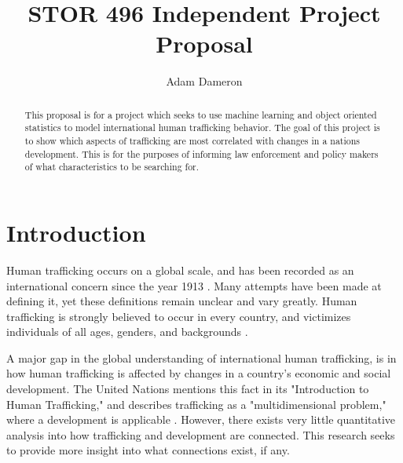 \documentclass{article} %
\title{STOR 496 Independent Project Proposal}
\author{
Adam Dameron
}
\begin{document}
\maketitle

\begin{abstract}
This proposal is for a project which seeks to use machine learning and object oriented statistics to model international human trafficking behavior. The goal of this project is to show which aspects of trafficking are most correlated with changes in a nations development. This is for the purposes of informing law enforcement and policy makers of what characteristics to be searching for.
\end{abstract}

\section{Introduction}
	Human trafficking occurs on a global scale, and has been recorded as an international concern since the year 1913 \parencite{Aromaa2007}. Many attempts have been made at defining it, yet these definitions remain unclear and vary greatly. Human trafficking is strongly believed to occur in every country, and victimizes individuals of all ages, genders, and backgrounds \parencite{JacK2012}.\medskip
	
	A major gap in the global understanding of international human trafficking, is in how human trafficking is affected by changes in a country's economic and social development. The United Nations mentions this fact in its "Introduction to Human Trafficking," and describes trafficking as a "multidimensional problem," where a development is applicable \parencite{kangaspunta_2008}. However, there exists very little quantitative analysis into how trafficking and development are connected. This research seeks to provide more insight into what connections exist, if any.
	
	
\end{document}
